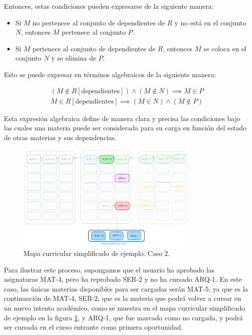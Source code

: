 Entonces, estas condiciones pueden expresarse de la siguiente manera:

\begin{itemize}
    \item Si \( M \) no pertenece al conjunto de dependientes de \( R \) y no está en el conjunto \( N \), entonces \( M \) pertenece al conjunto \( P \).
    \item Si \( M \) pertenece al conjunto de dependientes de \( R \), entonces \( M \) se coloca en el conjunto \( N \) y se elimina de \( P \).
\end{itemize}

Esto se puede expresar en términos algebraicos de la siguiente manera:

\begin{equation}
    \begin{split}
        (M \notin R[\text{dependientes}]) \wedge (M \notin N) \implies M \in P \\
        M \in R[\text{dependientes}] \implies (M \in N) \wedge (M \notin P )
    \end{split}
    \label{eq:condicion_de_seriacion_para_filtro_de_materias.}
\end{equation} 

Esta expresión algebraica define de manera clara y precisa las condiciones bajo las cuales una materia puede ser considerada para su carga en función del estado de otras materias y sus dependencias.

\begin{figure}[h]
    \centering
    \includegraphics[width=0.8\textwidth]{images/AG-Simple-Serial-Squeme-3.png}
    \caption{Mapa curricular simplificado de ejemplo: Caso 2.}
    \label{fig:mapa_curricular_simplificado_caso_2}
\end{figure}

Para ilustrar este proceso, supongamos que el usuario ha aprobado las asignaturas MAT-4, pero ha reprobado SER-2 y no ha cursado ARQ-1. En este caso, las únicas materias disponibles para ser cargadas serán MAT-5, ya que es la continuación de MAT-4, SER-2, que es la materia que podrá volver a cursar en un nuevo intento académico, como se muestra en el mapa curricular simplificado de ejemplo en la figura \ref{fig:mapa_curricular_simplificado_caso_2}, y ARQ-1, que fue marcado como no cargada, y podrá ser cursada en el curso entrante como primera oportunidad.


